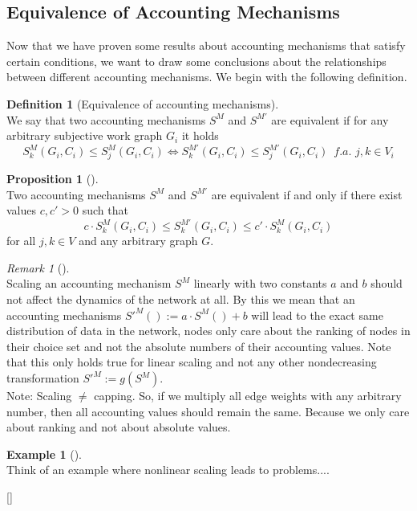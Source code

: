 \documentclass[11pt,a4paper]{report}
\theoremstyle{definition}
\newtheorem{definition}{Definition}[section]
\theoremstyle{theorem}
\theoremstyle{proposition}
\newtheorem{proposition}{Proposition}[section]
\theoremstyle{corollary}
\theoremstyle{lemma}
\theoremstyle{example}
\newtheorem{example}{Example}[section]
\theoremstyle{remark}
\newtheorem{remark}{Remark}[section]
\begin{document}
\subsection{Equivalence of Accounting Mechanisms}
\label{subsec:Equivalence of Accounting Mechanisms}
Now that we have proven some results about accounting mechanisms that satisfy certain conditions, we want to draw some conclusions about the relationships between different accounting mechanisms. We begin with the following definition. 
\begin{definition}[Equivalence of accounting mechanisms]\ \\
We say that two accounting mechanisms $S^M$ and $S^{M'}$ are equivalent if for any arbitrary subjective work graph $G_i$ it holds 
\[
S^M_k(G_i,C_i)\leq{}S^M_j(G_i,C_i) \Leftrightarrow S^{M'}_k(G_i,C_i)\leq{}S^{M'}_j(G_i,C_i)\,\,\,\textit{f.a. }j,k\in{}V_i
\]
\end{definition}

\begin{proposition}[]\ \\
Two accounting mechanisms $S^M$ and $S^{M'}$ are equivalent if and only if there exist values $c,c'>0$ such that 
\[
c\cdot{}S^M_k(G_i,C_i) \leq S^{M'}_k(G_i,C_i) \leq c'\cdot{}S^M_k(G_i,C_i) 
\]
for all $j,k\in{}V$ and any arbitrary graph $G$. 
\end{proposition}

\begin{remark}[]\ \\
Scaling an accounting mechanism $S^M$ linearly with two constants $a$ and $b$ should not affect the dynamics of the network at all. By this we mean that an accounting mechanisms $S'^M():=a\cdot{}S^M()+b$ will lead to the exact same distribution of data in the network, nodes only care about the ranking of nodes in their choice set and not the absolute numbers of their accounting values. Note that this only holds true for linear scaling and not any other nondecreasing transformation $S'^M:=g(S^M)$. \vspace{1em}\\

\noindent{}Note: Scaling $\neq$ capping. So, if we multiply all edge weights with any arbitrary number, then all accounting values should remain the same. Because we only care about ranking and not about absolute values.
\end{remark}

\begin{example}[]\ \\
Think of an example where nonlinear scaling leads to problems....
\end{example}[]\ \\
\end{document}
